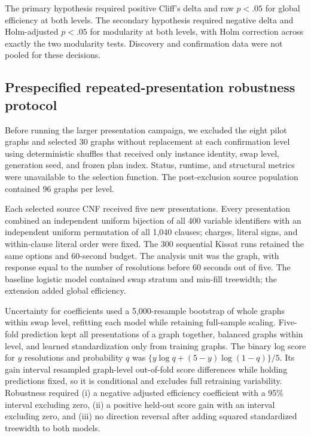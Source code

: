 \documentclass[11pt]{article}
\begin{document}
The primary hypothesis required positive Cliff's delta and raw $p<.05$ for global efficiency at both levels. The secondary hypothesis required negative delta and Holm-adjusted $p<.05$ for modularity at both levels, with Holm correction across exactly the two modularity tests. Discovery and confirmation data were not pooled for these decisions.

\subsection{Prespecified repeated-presentation robustness protocol}

Before running the larger presentation campaign, we excluded the eight pilot graphs and selected 30 graphs without replacement at each confirmation level using deterministic shuffles that received only instance identity, swap level, generation seed, and frozen plan index. Status, runtime, and structural metrics were unavailable to the selection function. The post-exclusion source population contained 96 graphs per level.

Each selected source CNF received five new presentations. Every presentation combined an independent uniform bijection of all 400 variable identifiers with an independent uniform permutation of all 1,040 clauses; charges, literal signs, and within-clause literal order were fixed. The 300 sequential Kissat runs retained the same options and 60-second budget. The analysis unit was the graph, with response equal to the number of resolutions before 60 seconds out of five. The baseline logistic model contained swap stratum and min-fill treewidth; the extension added global efficiency.

Uncertainty for coefficients used a 5,000-resample bootstrap of whole graphs within swap level, refitting each model while retaining full-sample scaling. Five-fold prediction kept all presentations of a graph together, balanced graphs within level, and learned standardization only from training graphs. The binary log score for $y$ resolutions and probability $q$ was $\{y\log q+(5-y)\log(1-q)\}/5$. Its gain interval resampled graph-level out-of-fold score differences while holding predictions fixed, so it is conditional and excludes full retraining variability. Robustness required (i) a negative adjusted efficiency coefficient with a 95\% interval excluding zero, (ii) a positive held-out score gain with an interval excluding zero, and (iii) no direction reversal after adding squared standardized treewidth to both models.
\end{document}
